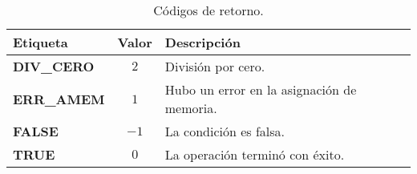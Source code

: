 \begin{table}[!hbp]
\begin{center}
\begin{tabular}{|l|c|l|}
\hline
Etiqueta & Valor & Descripci\'on \\
\hline
\textbf{DIV\_CERO} & $2$ & Divisi\'on por cero. \\
\textbf{ERR\_AMEM} & $1$ & Hubo un error en la asignaci\'on de memoria.\\
\textbf{FALSE} & $-1$ & La condici\'on es falsa. \\
\textbf{TRUE} & $0$ & La operaci\'on termin\'o con \'exito. \\
\hline
\end{tabular}
\end{center}
\caption{C\'odigos de retorno.}
\end{table}
